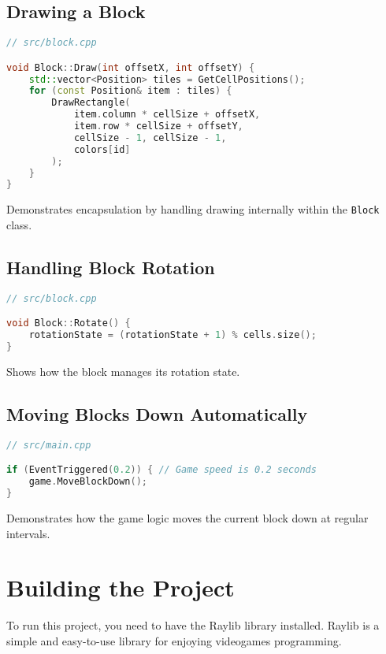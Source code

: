 \documentclass{article}
\begin{document}
\subsection{Drawing a Block}

\begin{lstlisting}[language=C++]
// src/block.cpp

void Block::Draw(int offsetX, int offsetY) {
    std::vector<Position> tiles = GetCellPositions();
    for (const Position& item : tiles) {
        DrawRectangle(
            item.column * cellSize + offsetX,
            item.row * cellSize + offsetY,
            cellSize - 1, cellSize - 1,
            colors[id]
        );
    }
}
\end{lstlisting}

Demonstrates encapsulation by handling drawing internally within the \texttt{Block} class.

\subsection{Handling Block Rotation}

\begin{lstlisting}[language=C++]
// src/block.cpp

void Block::Rotate() {
    rotationState = (rotationState + 1) % cells.size();
}
\end{lstlisting}

Shows how the block manages its rotation state.

\subsection{Moving Blocks Down Automatically}

\begin{lstlisting}[language=C++]
// src/main.cpp

if (EventTriggered(0.2)) { // Game speed is 0.2 seconds
    game.MoveBlockDown();
}
\end{lstlisting}

Demonstrates how the game logic moves the current block down at regular intervals.

\section{Building the Project}

To run this project, you need to have the Raylib library installed. Raylib is a simple and easy-to-use library for enjoying videogames programming.
\end{document}
